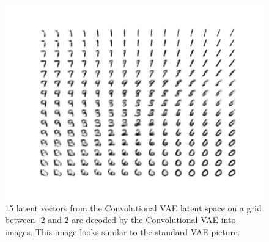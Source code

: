 \documentclass[11pt]{article}
\begin{document}
\begin{figure}
  \centering
  \includegraphics[width=15cm]{imgs/convgridvae}
  \caption{\label{fig:convlatent} 15 latent vectors from the Convolutional VAE latent space on a grid between -2 and 2 are decoded by the Convolutional VAE into images. This image looks similar to the standard VAE picture.}
\end{figure}
\end{document}
